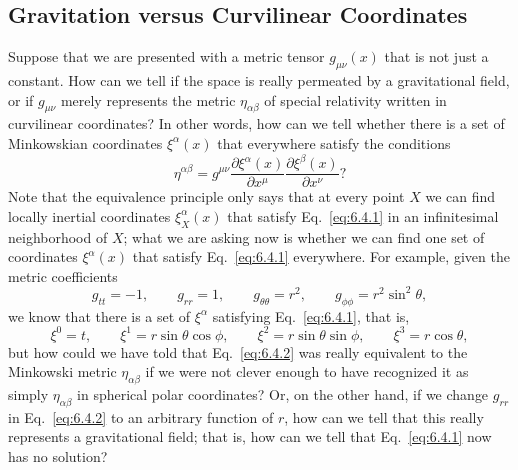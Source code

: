 
\subsection{Gravitation versus Curvilinear Coordinates}\label{sec:6.4}

Suppose that we are presented with a metric tensor \(g_{\mu\nu}(x)\) that is
not just a constant. How can we tell if the space is really permeated by a
gravitational field, or if \(g_{\mu\nu}\) merely represents the metric
\(\eta_{\alpha\beta}\) of special relativity written in curvilinear
coordinates? In other words, how can we tell whether there is a set of
Minkowskian coordinates \(\xi^\alpha(x)\) that everywhere satisfy the
conditions
\begin{equation}
  \eta^{\alpha\beta}
  =
  g^{\mu\nu}
  \frac{\partial\xi^\alpha(x)}{\partial x^\mu}
  \frac{\partial\xi^\beta(x)}{\partial x^\nu}?
  \tag{6.4.1}\label{eq:6.4.1}
\end{equation}
Note that the equivalence principle only says that at every point \(X\) we
can find locally inertial coordinates \(\xi_X^\alpha(x)\) that satisfy
Eq.~\eqref{eq:6.4.1} in an infinitesimal neighborhood of \(X\); what we are
asking now is whether we can find one set of coordinates \(\xi^\alpha(x)\)
that satisfy Eq.~\eqref{eq:6.4.1} everywhere. For example, given the metric
coefficients
\begin{equation}
  g_{tt}=-1,
  \qquad
  g_{rr}=1,
  \qquad
  g_{\theta\theta}=r^2,
  \qquad
  g_{\phi\phi}=r^2\sin^2\theta,
  \tag{6.4.2}\label{eq:6.4.2}
\end{equation}
we know that there is a set of \(\xi^\alpha\) satisfying
Eq.~\eqref{eq:6.4.1}, that is,
\begin{equation}
  \xi^0=t,
  \qquad
  \xi^1=r\sin\theta\cos\phi,
  \qquad
  \xi^2=r\sin\theta\sin\phi,
  \qquad
  \xi^3=r\cos\theta,
  \tag{6.4.3}\label{eq:6.4.3}
\end{equation}
but how could we have told that Eq.~\eqref{eq:6.4.2} was really equivalent to
the Minkowski metric \(\eta_{\alpha\beta}\) if we were not clever enough to
have recognized it as simply \(\eta_{\alpha\beta}\) in spherical polar
coordinates? Or, on the other hand, if we change \(g_{rr}\) in
Eq.~\eqref{eq:6.4.2} to an arbitrary function of \(r\), how can we tell that
this really represents a gravitational field; that is, how can we tell that
Eq.~\eqref{eq:6.4.1} now has no solution?

